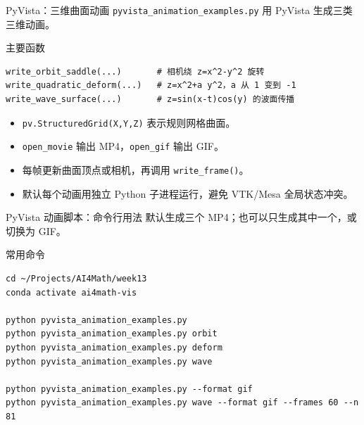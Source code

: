 \documentclass[aspectratio=169,11pt]{ctexbeamer}
\begin{document}
\begin{frame}[fragile]{PyVista：三维曲面动画}
  \texttt{pyvista\_animation\_examples.py} 用 PyVista 生成三类三维动画。

  \begin{block}{主要函数}
\begin{Verbatim}[fontsize=\small]
write_orbit_saddle(...)       # 相机绕 z=x^2-y^2 旋转
write_quadratic_deform(...)   # z=x^2+a y^2，a 从 1 变到 -1
write_wave_surface(...)       # z=sin(x-t)cos(y) 的波面传播
\end{Verbatim}
  \end{block}

  \begin{itemize}
    \item \texttt{pv.StructuredGrid(X,Y,Z)} 表示规则网格曲面。
    \item \texttt{open\_movie} 输出 MP4，\texttt{open\_gif} 输出 GIF。
    \item 每帧更新曲面顶点或相机，再调用 \texttt{write\_frame()}。
    \item 默认每个动画用独立 Python 子进程运行，避免 VTK/Mesa 全局状态冲突。
  \end{itemize}
\end{frame}

\begin{frame}[fragile]{PyVista 动画脚本：命令行用法}
  默认生成三个 MP4；也可以只生成其中一个，或切换为 GIF。

  \begin{block}{常用命令}
\begin{Verbatim}[fontsize=\small]
cd ~/Projects/AI4Math/week13
conda activate ai4math-vis

python pyvista_animation_examples.py
python pyvista_animation_examples.py orbit
python pyvista_animation_examples.py deform
python pyvista_animation_examples.py wave

python pyvista_animation_examples.py --format gif
python pyvista_animation_examples.py wave --format gif --frames 60 --n 81
\end{Verbatim}
  \end{block}
\end{frame}
\end{document}
